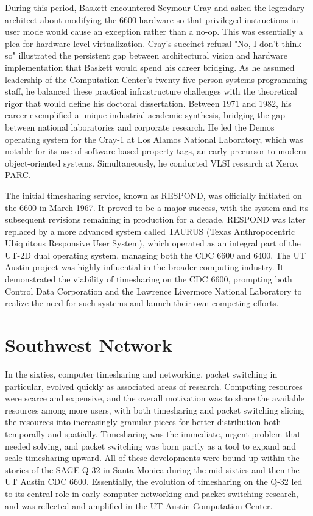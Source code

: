 During this period, Baskett encountered Seymour Cray and asked the legendary architect about modifying the 6600 hardware so that privileged instructions in user mode would cause an exception rather than a no-op. This was essentially a plea for hardware-level virtualization. Cray’s succinct refusal "No, I don’t think so" illustrated the persistent gap between architectural vision and hardware implementation that Baskett would spend his career bridging. As he assumed leadership of the Computation Center’s twenty-five person systems programming staff, he balanced these practical infrastructure challenges with the theoretical rigor that would define his doctoral dissertation. Between 1971 and 1982, his career exemplified a unique industrial-academic synthesis, bridging the gap between national laboratories and corporate research. He led the Demos operating system for the Cray-1 at Los Alamos National Laboratory, which was notable for its use of software-based property tags, an early precursor to modern object-oriented systems. Simultaneously, he conducted VLSI research at Xerox PARC.

The initial timesharing service, known as RESPOND, was officially initiated on the 6600 in March 1967. It proved to be a major success, with the system and its subsequent revisions remaining in production for a decade. RESPOND was later replaced by a more advanced system called TAURUS (Texas Anthropocentric Ubiquitous Responsive User System), which operated as an integral part of the UT-2D dual operating system, managing both the CDC 6600 and 6400. The UT Austin project was highly influential in the broader computing industry. It demonstrated the viability of timesharing on the CDC 6600, prompting both Control Data Corporation and the Lawrence Livermore National Laboratory to realize the need for such systems and launch their own competing efforts.

\section{Southwest Network}

In the sixties, computer timesharing and networking, packet switching in particular, evolved quickly as associated areas of research. Computing resources were scarce and expensive, and the overall motivation was to share the available resources among more users, with both timesharing and packet switching slicing the resources into increasingly granular pieces for better distribution both temporally and spatially. Timesharing was the immediate, urgent problem that needed solving, and packet switching was born partly as a tool to expand and scale timesharing upward. All of these developments were bound up within the stories of the SAGE Q-32 in Santa Monica during the mid sixties and then the UT Austin CDC 6600. Essentially, the evolution of timesharing on the Q-32 led to its central role in early computer networking and packet switching research, and was reflected and amplified in the UT Austin Computation Center.

